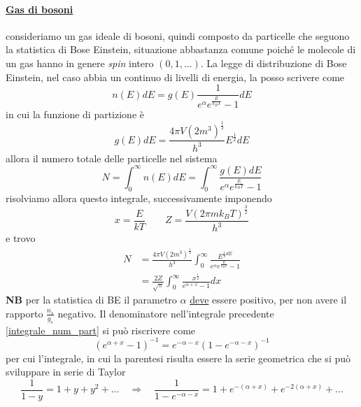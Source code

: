 \paragraph{\underline{Gas di bosoni}} consideriamo un gas ideale di bosoni, quindi composto da particelle che seguono la statistica di Bose Einstein, situazione abbastanza comune poiché le molecole di un gas hanno in genere \textit{spin} intero $(0, 1, ...)$.
La legge di distribuzione di Bose Einstein, nel caso abbia un continuo di livelli di energia, la posso scrivere come
\begin{equation}
n(E)dE = g(E) \frac{1}{e^{ \alpha } e^{ \frac{E}{k_B T} } - 1 } dE
\end{equation}
in cui la funzione di partizione è
\begin{equation}
g(E)dE = \frac{4\pi V (2m^3)^{ \frac{1}{2} }}{h^3} E^{\frac{1}{2} } dE
\end{equation}
allora il numero totale delle particelle nel sistema
\begin{equation}
N = \int_0^{\infty} n(E)dE =  \int_0^{\infty} \frac{g(E) dE}{e^{\alpha} e^{ \frac{E}{k_B T} } - 1} 
\end{equation}
risolviamo allora questo integrale, successivamente imponendo
\begin{equation}
x = \frac{E}{kT} \quad\quad Z = \frac{V (2 \pi m k_B T)^{ \frac{3}{2} } }{h^3}
\end{equation}
e trovo
\begin{equation}
\begin{split}
N & = \frac{4\pi V (2m^3)^{ \frac{1}{2} }}{h^3} \int_0^{\infty} \frac{E^{ \frac{1}{2} dE }}{e^{\alpha} e^{ \frac{E}{k_B T} } - 1}  \\
&= \frac{2Z}{\sqrt{\pi}} \int_0^{\infty} \frac{x^{ \frac{1}{2} }}{e^{ \alpha + x } - 1} dx
\label{integrale_num_part}
\end{split}
\end{equation}
\textbf{NB} per la statistica di BE il parametro $\alpha$ \underline{deve} essere positivo, per non avere il rapporto $\frac{n_s}{g_s}$ negativo.
Il denominatore nell'integrale precedente \ref{integrale_num_part} si può riscrivere come
\begin{equation}
(e^{ \alpha + x } - 1)^{-1} = e^{ - \alpha - x } (1 - e^{ - \alpha - x })^{ -1 }
\end{equation}
per cui l'integrale, in cui la parentesi risulta essere la serie geometrica che si può sviluppare in serie di Taylor
$$ \frac{1}{1-y} = 1 + y + y^2 + ... \quad\Rightarrow\quad \frac{1}{1 - e^{ -\alpha - x }} = 1 + e^{ - ( \alpha + x) } + e^{ - 2 ( \alpha + x) } + ... $$
